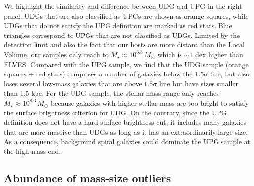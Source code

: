 \documentclass[twocolumn,astrosymb,twocolappendix]{aastex631}
\begin{document}
\begin{CJK*}{UTF8}{gbsn}
We highlight the similarity and difference between UDG and UPG in the right panel. UDGs that are also classified as UPGs are shown as orange squares, while UDGs that do not satisfy the UPG definition are marked as red stars. Blue triangles correspond to UPGs that are not classified as UDGs. Limited by the detection limit and also the fact that our hosts are more distant than the Local Volume, our samples only reach to $M_\star \approx 10^{6.8}\ M_\odot$ which is $\sim 1$ dex higher than ELVES. 
Compared with the UPG sample, we find that the UDG sample (orange squares + red stars) comprises a number of galaxies below the $1.5\sigma$ line, but also loses several low-mass galaxies that are above $1.5\sigma$ line but have sizes smaller than 1.5 kpc. For the UDG sample, the stellar mass range only reaches $M_\star\approx 10^{8.3}\ M_\odot$ because galaxies with higher stellar mass are too bright to satisfy the surface brightness criterion for UDG. On the contrary, since the UPG definition does not have a hard surface brightness cut, it includes many galaxies that are more massive than UDGs as long as it has an extraordinarily large size. As a consequence, background spiral galaxies could dominate the UPG sample at the high-mass end. 



\subsection{Abundance of mass-size outliers}\label{sec:n_udg}


\end{CJK*}
\end{document}
